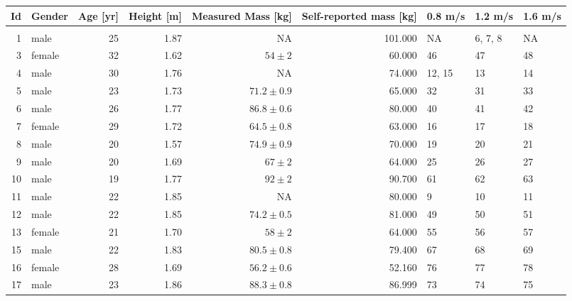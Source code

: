 \begin{tabular}{rlrrrrlll}
\toprule
 Id &  Gender &  Age [yr] & Height [m] &            Measured Mass [kg] &  Self-reported mass [kg] & 0.8 m/s &  1.2 m/s & 1.6 m/s \\
\midrule
    &         &           &            &                               &                          &         &          &         \\
  1 &    male &        25 &       1.87 &                            NA &                  101.000 &      NA &  6, 7, 8 &      NA \\
  3 &  female &        32 &       1.62 &      $54\pm2$ &                   60.000 &      46 &       47 &      48 \\
  4 &    male &        30 &       1.76 &                            NA &                   74.000 &  12, 15 &       13 &      14 \\
  5 &    male &        23 &       1.73 &  $71.2\pm0.9$ &                   65.000 &      32 &       31 &      33 \\
  6 &    male &        26 &       1.77 &  $86.8\pm0.6$ &                   80.000 &      40 &       41 &      42 \\
  7 &  female &        29 &       1.72 &  $64.5\pm0.8$ &                   63.000 &      16 &       17 &      18 \\
  8 &    male &        20 &       1.57 &  $74.9\pm0.9$ &                   70.000 &      19 &       20 &      21 \\
  9 &    male &        20 &       1.69 &      $67\pm2$ &                   64.000 &      25 &       26 &      27 \\
 10 &    male &        19 &       1.77 &      $92\pm2$ &                   90.700 &      61 &       62 &      63 \\
 11 &    male &        22 &       1.85 &                            NA &                   80.000 &       9 &       10 &      11 \\
 12 &    male &        22 &       1.85 &  $74.2\pm0.5$ &                   81.000 &      49 &       50 &      51 \\
 13 &  female &        21 &       1.70 &      $58\pm2$ &                   64.000 &      55 &       56 &      57 \\
 15 &    male &        22 &       1.83 &  $80.5\pm0.8$ &                   79.400 &      67 &       68 &      69 \\
 16 &  female &        28 &       1.69 &  $56.2\pm0.6$ &                   52.160 &      76 &       77 &      78 \\
 17 &    male &        23 &       1.86 &  $88.3\pm0.8$ &                   86.999 &      73 &       74 &      75 \\
\bottomrule
\end{tabular}
